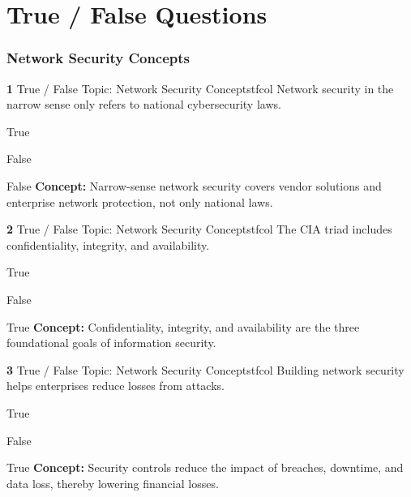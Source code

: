 \documentclass[10pt,a4paper]{article}
\begin{document}
\part{True / False Questions}
\section{Network Security Concepts}
\begin{qcard}{\color{white}\textbf{1} \hfill \small True / False \textbar{} Topic: Network Security Concepts}{tfcol}
Network security in the narrow sense only refers to national cybersecurity laws.

\begin{qoptions}
\item True
\item False
\end{qoptions}
\begin{explainbox}{False}
\textbf{Concept:} Narrow-sense network security covers vendor solutions and enterprise network protection, not only national laws.
\end{explainbox}
\end{qcard}

\begin{qcard}{\color{white}\textbf{2} \hfill \small True / False \textbar{} Topic: Network Security Concepts}{tfcol}
The CIA triad includes confidentiality, integrity, and availability.

\begin{qoptions}
\item True
\item False
\end{qoptions}
\begin{explainbox}{True}
\textbf{Concept:} Confidentiality, integrity, and availability are the three foundational goals of information security.
\end{explainbox}
\end{qcard}

\begin{qcard}{\color{white}\textbf{3} \hfill \small True / False \textbar{} Topic: Network Security Concepts}{tfcol}
Building network security helps enterprises reduce losses from attacks.

\begin{qoptions}
\item True
\item False
\end{qoptions}
\begin{explainbox}{True}
\textbf{Concept:} Security controls reduce the impact of breaches, downtime, and data loss, thereby lowering financial losses.
\end{explainbox}
\end{qcard}
\end{document}
